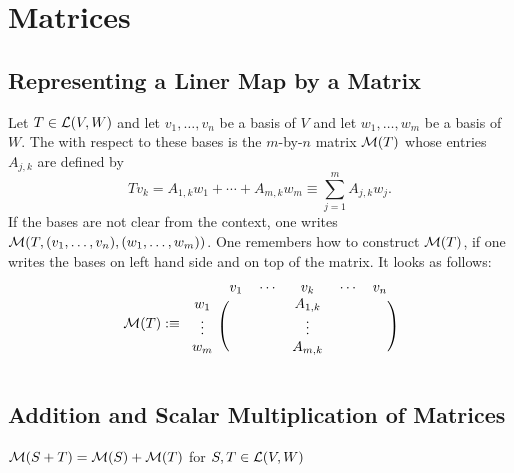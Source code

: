 \section{Matrices}
\subsection{Representing a Liner Map by a Matrix}

\setcounter{thm}{30}
\begin{mydef}
  \label{def: matrix of a linear map}
  Let $T \in \mathcal{L} (V,W)$ and let $v_1, \dots, v_n$ be a basis of $V$ and let $w_1, \dots, w_m$ be a basis of $W$. The  with respect to these bases is the $m$-by-$n$ matrix $\mathcal{M}(T)$ whose entries $A_{j,k}$ are defined by
  \begin{equation}
    T v_k = A_{1,k} w_1 + \cdots + A_{m,k} w_m \equiv \sum_{j=1}^{m} A_{j,k} w_j.
  \end{equation}
  If the bases are not clear from the context, one writes $\mathcal{M}(T, (v_1, \dots, v_n),(w_1, \dots, w_m))$. One remembers how to construct $\mathcal{M}(T)$, if one writes the bases on left hand side and on top of the matrix. It looks as follows:
  \begin{equation}
    \mathcal{M} (T) :\equiv
      \begin{blockarray}{cccccc}
                 & v_1 & \cdots & v_k     & \cdots & v_n \\
        \begin{block}{c(ccccc)}
          w_1    &     &        & A_{1,k} &        &     \\
          \vdots &     &        & \vdots  &        &     \\
          w_m    &     &        & A_{m,k} &        &     \\
        \end{block}
      \end{blockarray}
  \end{equation}
\end{mydef}

\subsection{Addition and Scalar Multiplication of Matrices}

\setcounter{thm}{34}
\begin{thm}
  $\mathcal{M}(S+T) = \mathcal{M}(S) + \mathcal{M}(T)$ for $S, T \in \mathcal{L} (V,W)$
\end{thm}

